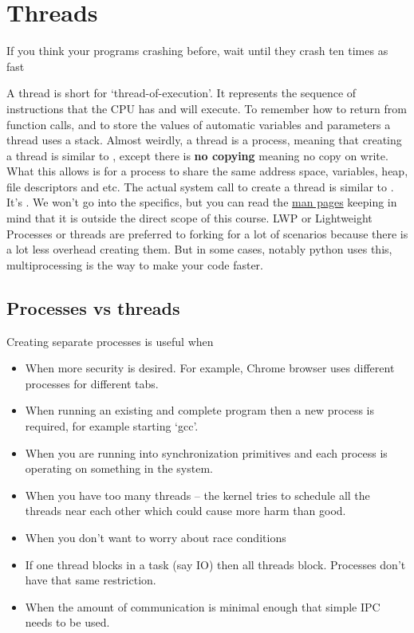 \chapter{Threads}

\epigraph{If you think your programs crashing before, wait until they crash ten times as fast}{}

A thread is short for `thread-of-execution'.
It represents the sequence of instructions that the CPU has and will execute.
To remember how to return from function calls, and to store the values of automatic variables and parameters a thread uses a stack.
Almost weirdly, a thread is a process, meaning that creating a thread is similar to , except there is \textbf{no copying} meaning no copy on write.
What this allows is for a process to share the same address space, variables, heap, file descriptors and etc.
The actual system call to create a thread is similar to . It's .
We won't go into the specifics, but you can read the \href{http://man7.org/linux/man-pages/man2/clone.2.html}{man pages} keeping in mind that it is outside the direct scope of this course.
LWP or Lightweight Processes or threads are preferred to forking for a lot of scenarios because there is a lot less overhead creating them.
But in some cases, notably python uses this, multiprocessing is the way to make your code faster.

\section{Processes vs threads}

Creating separate processes is useful when

\begin{itemize}
\item When more security is desired. For example, Chrome browser uses different processes for different tabs.
\item When running an existing and complete program then a new process is required, for example starting `gcc'.
\item When you are running into synchronization primitives and each process is operating on something in the system.
\item When you have too many threads -- the kernel tries to schedule all the threads near each other which could cause more harm than good.
\item When you don't want to worry about race conditions
\item If one thread blocks in a task (say IO) then all threads block. Processes don't have that same restriction.
\item When the amount of communication is minimal enough that simple IPC needs to be used.
\end{itemize}

